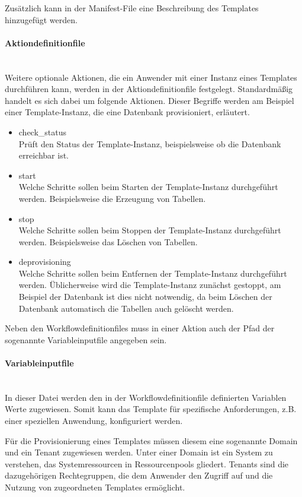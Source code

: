 Zusätzlich kann in der Manifest-File eine Beschreibung des Templates hinzugefügt werden.
\cite{IBM.2019}
\paragraph{\glqq Aktiondefinitionfile\grqq} ~\\
Weitere optionale Aktionen, die ein Anwender mit einer Instanz eines Templates durchführen kann, werden in der Aktiondefinitionfile festgelegt.
Standardmäßig handelt es sich dabei um folgende Aktionen.
Dieser Begriffe werden am Beispiel einer Template-Instanz, die eine Datenbank provisioniert, erläutert.
\begin{itemize}
\item check\_status\\
Prüft den Status der Template-Instanz, beispielsweise ob die Datenbank erreichbar ist.
\item start\\
Welche Schritte sollen beim Starten der Template-Instanz durchgeführt werden.
Beispielsweise die Erzeugung von Tabellen.
\item stop\\
Welche Schritte sollen beim Stoppen der Template-Instanz durchgeführt werden.
Beispielsweise das Löschen von Tabellen.
\item deprovisioning\\
Welche Schritte sollen beim Entfernen der Template-Instanz durchgeführt werden.
Üblicherweise wird die Template-Instanz zunächst gestoppt, am Beispiel der Datenbank ist dies nicht notwendig, da beim Löschen der Datenbank automatisch die Tabellen auch gelöscht werden.
\end{itemize}

Neben den Workflowdefinitionfiles muss in einer Aktion auch der Pfad der sogenannte \glqq Variableinputfile\grqq{} angegeben sein.

\paragraph{\glqq Variableinputfile\grqq}\label{par:variable} ~\\
In dieser Datei werden den in der Workflowdefinitionfile definierten Variablen Werte zugewiesen.
Somit kann das Template für spezifische Anforderungen, z.B. einer speziellen Anwendung,  konfiguriert werden.

Für die Provisionierung eines Templates müssen diesem eine sogenannte \glqq Domain\grqq{} und ein \glqq Tenant\grqq{} zugewiesen werden.
Unter einer \glqq Domain\grqq{} ist ein System zu verstehen, das Systemressourcen in Ressourcenpools gliedert.
\glqq Tenants\grqq{} sind die dazugehörigen Rechtegruppen, die dem Anwender den Zugriff auf und die Nutzung von zugeordneten Templates ermöglicht.
\cite{Rotthove.2018}


